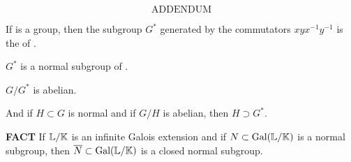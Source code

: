 \vspace{0.3cm}

\[
\text{ADDENDUM}
\]
\setcounter{theoremn}{0}

\vspace{0.1cm}

If \mG is a group, then the subgroup $G^*$ generated by the commutators $x y x^{-1}y^{-1}$ is the 
of \mG.

\vspace{0.2cm}

\qquad\qquad \textbullet \quad $G^*$ is a normal subgroup of \mG.

\vspace{0.1cm}

\qquad\qquad \textbullet \quad $G / G^*$ is abelian.

\vspace{0.1cm}

And if $H \subset G$ is normal and if $G/H$ is abelian, then $H \supset G^*$.

\vspace{0.1cm}


\vspace{0.3cm}

{\small\bf FACT}
If  $\mathbb{L}/\mathbb{K}$ is an infinite Galois extension and if $N \subset \text{Gal}(\mathbb{L}/\mathbb{K})$ is a normal subgroup, then 
$\overline{N} \subset \text{Gal}(\mathbb{L}/\mathbb{K})$ is a closed normal subgroup. 








